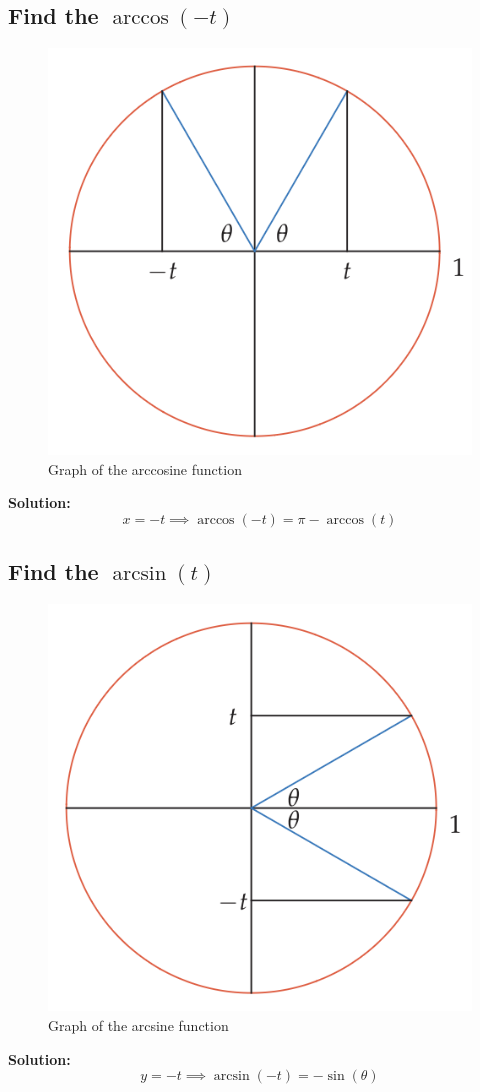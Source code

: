 \subsection{Find the $\arccos(-t)$}
\begin{figure}
    \centering
    \includegraphics[scale=0.4]{pics/21.png}
    \caption{Graph of the arccosine function}
\end{figure}
\textbf{Solution:}
\[ x = -t \implies \arccos(-t) = \pi - \arccos(t) \]

\subsection{Find the $\arcsin(t)$}
\begin{figure}
    \centering
    \includegraphics[scale=0.4]{pics/22.png}
    \caption{Graph of the arcsine function}
\end{figure}
\textbf{Solution:}
\[ y = -t \implies \arcsin(-t) = -\sin(\theta) \]

